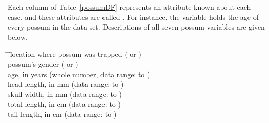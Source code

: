 Each column of Table~\ref{possumDF} represents an attribute known about each case, and these attributes are called . For instance, the  variable holds the age of every possum in the data set. Descriptions of all seven {possum} variables are given below. %
\begin{tabbing}
\hspace{\parindent}\=   \=\hspace{10mm}\=  location where possum was trapped ( or ) \\
\>  \>\>  possum's gender ( or ) \\
\>  \>\>  age, in years (whole number, data range:  to ) \\
\>  \>\>  head length, in mm (data range:  to ) \\
\>  \>\>  skull width, in mm (data range:  to ) \\
\>  \>\>  total length, in cm (data range:  to ) \\
\>  \>\>  tail length, in cm (data range:  to ) \\
\end{tabbing}
\addvspace{-5mm}

